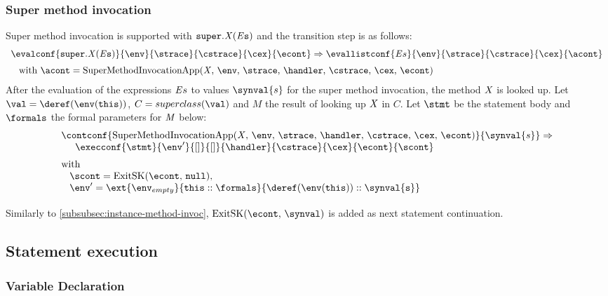 \documentclass{article}
\begin{document}
\subsubsection{Super method invocation}
\label{subsubsec:super-method-invocation}
\newcommand{\SuperMethodInvocation}[2]{\tt{super}.#1(#2)}
\newcommand{\SuperMethodInvocationApp}{\mathrm{SuperMethodInvocationApp}(\idmeta,\,\env,\,\strace,\,\handler,\,\cstrace,\,\cex,\,\econt)}
Super method invocation is supported with $\SuperMethodInvocation{\idmeta}{\expressionsmeta}$ and the transition step is as follows:
\[
  \begin{array}{l}
	\evalconf{\SuperMethodInvocation{\idmeta}{\expressionsmeta}}{\env}{\strace}{\cstrace}{\cex}{\econt}
	\Rightarrow
	\evallistconf{\expressionsmeta}{\env}{\strace}{\cstrace}{\cex}{\acont}
	\\[2mm]
	\hspace{3mm}\textrm{with } \acont = \SuperMethodInvocationApp
  \end{array}
\]
After the evaluation of the expressions $\mathit{E}{s}$ to values $\synval{s}$ for the super method invocation, the method $\mathit{X}$ is looked up. Let $\val = \deref(\env(\this))$, $C = \superclass{\val}$ and $M$ the result of looking up $\mathit{X}$ in $C$. Let $\stmt$ be the statement body and $\formals$ the formal parameters for $\mathit{M}$ below:
\[
  \begin{array}{l}
	\contconf{\SuperMethodInvocationApp}{\synval{s}}
	\Rightarrow \\
	\hspace{5mm}\execconf{\stmt}{\env'}{[]}{[]}{\handler}{\cstrace}{\cex}{\econt}{\scont}
	\\[2mm]
	\textrm{with }\\
	\hspace{3mm}\scont = \ExitSK{\tt{null}},\\
	\hspace{3mm}\env' = \ext{\env_{empty}}{\this :: \formals}{\deref(\env(\this)) :: \synval{s}}\\[2mm]
  \end{array}
\]
Similarly to \ref{subsubsec:instance-method-invoc}, $\ExitSK{\synval}$ is added as next statement continuation.
\subsection{Statement execution}
\label{subsec:stmt-exectution}

\subsubsection{Variable Declaration}
\end{document}
